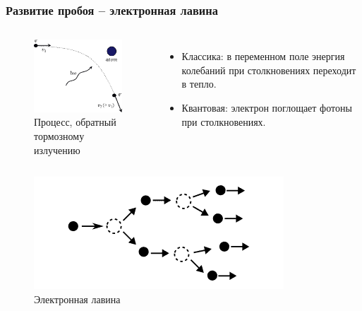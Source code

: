 \documentclass{beamer}
\begin{document}
	\begin{frame}
		\frametitle{Развитие пробоя -- электронная лавина}
		
		\begin{columns}
			\begin{figure}
				\centering
				\includegraphics[width=0.7\linewidth]{res/inverse_bremsstrahlung.png}
				\caption*{Процесс, обратный тормозному излучению}
			\end{figure}
			\begin{itemize}
				\item Классика: в переменном поле энергия колебаний при столкновениях переходит в тепло.
				\item Квантовая: электрон поглощает фотоны при столкновениях.
			\end{itemize}
		\end{columns}
		\begin{columns}
			\column{0.5\linewidth}
			\begin{figure}
				\centering
				\includegraphics[width=0.8\linewidth]{res/electron_avalanche.png}
				\caption*{Электронная лавина}
			\end{figure}
		

\end{columns}
\end{frame}
\end{document}
